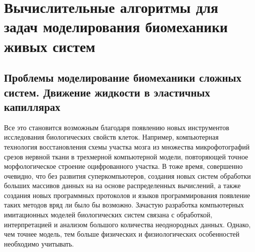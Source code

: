 \chapter{Вычислительные алгоритмы для задач моделирования биомеханики живых систем}\label{ch:ch1}

\section{Проблемы моделирование биомеханики сложных систем. Движение жидкости в эластичных капиллярах}\label{sec:ch1/sec1}

 
Все это становится возможным благодаря появлению новых инструментов исследования биологических свойств клеток. Например, компьютерная технология восстановления схемы участка мозга из множества микрофотографий срезов нервной ткани \cite{CHKLOVSKII2010667} в трехмерной компьютерной модели, повторяющей точное морфологическое строение оцифрованного участка. В тоже время, совершенно очевидно, что без развития суперкомпьютеров, создания новых систем обработки больших массивов данных на на основе распределенных вычислений, а также  создания новых программных протоколов и языков программирования  появление таких методов вряд ли было бы возможно. Зачастую разработка компьютерных имитационных моделей биологических систем связана с обработкой, интерпретацией и анализом большого количества неоднородных данных. Однако, чем точнее модель, тем больше физических и физиологических особенностей необходимо учитывать.

